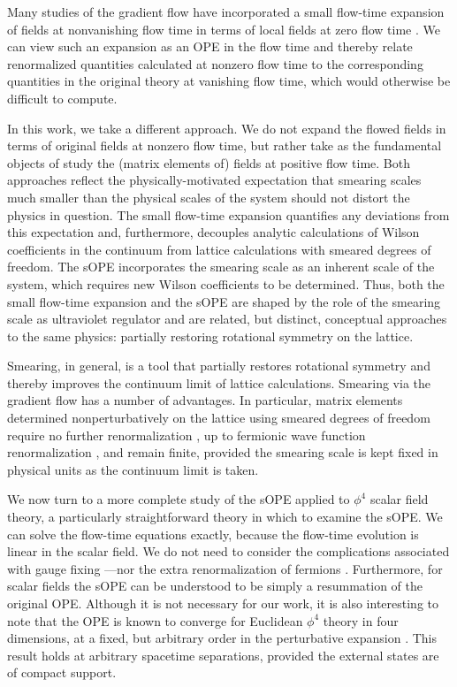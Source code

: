 Many studies of the gradient flow have incorporated a small flow-time expansion 
of fields at nonvanishing flow time in terms of local 
fields at zero 
flow time \cite{Shindler:2013bia,Suzuki:2013gza,DelDebbio:2013zaa, 
Makino:2014taa,Asakawa:2013laa,Luscher:2014kea}. We can view such an expansion 
as an OPE in the flow time and thereby relate 
renormalized quantities calculated at nonzero flow time to the corresponding 
quantities in the original theory at vanishing flow time, which would otherwise 
be difficult to compute.

In this work, we take a different approach. We do 
not expand the flowed fields in terms of original fields at nonzero flow time, 
but rather take 
as the fundamental objects of study the (matrix elements of)
fields at positive flow time. Both approaches reflect the physically-motivated 
expectation that smearing 
scales much smaller than the physical scales of the system should not distort 
the physics in question. The small flow-time expansion quantifies any 
deviations 
from this expectation and, 
furthermore, decouples analytic calculations of Wilson coefficients in the 
continuum from lattice calculations with smeared degrees of freedom. The sOPE 
incorporates the smearing scale as an inherent scale of the system, which 
requires new Wilson coefficients to be determined. Thus, both the small 
flow-time 
expansion and the sOPE are shaped by the role of the smearing scale as 
ultraviolet regulator and are related, but distinct, conceptual approaches to 
the same physics: partially restoring rotational symmetry on the lattice.

Smearing, in 
general, is a tool that partially restores rotational symmetry 
\cite{Davoudi:2012ya} and thereby improves the continuum limit of lattice 
calculations. Smearing via the gradient flow has a number of advantages. In 
particular, 
matrix elements determined nonperturbatively on the lattice using 
smeared degrees of freedom require no further renormalization 
\cite{Luscher:2010iy}, up to fermionic 
wave function renormalization \cite{Luscher:2013cpa}, and remain 
finite, provided the smearing scale is kept fixed in physical units as the 
continuum limit is taken.

We now turn to a more complete study of the sOPE applied to $\phi^4$ scalar 
field theory, a particularly straightforward theory in which to examine 
the sOPE. We can solve the flow-time 
equations exactly, because the flow-time 
evolution is linear in the scalar field.
We do not need to consider the complications associated with 
gauge fixing \cite{Luscher:2010iy,Luscher:2011bx}---nor the extra 
renormalization of fermions \cite{Luscher:2013cpa}. Furthermore, for scalar 
fields the sOPE can be understood to be simply a resummation of the original 
OPE. Although it is not necessary for our work, it is also interesting to note 
that 
the OPE is known to converge for Euclidean $\phi^4$ theory in four dimensions, 
at a fixed, but arbitrary order in the perturbative 
expansion \cite{Hollands:2011gf}. This result holds at arbitrary spacetime 
separations, provided the external states are of compact support.

